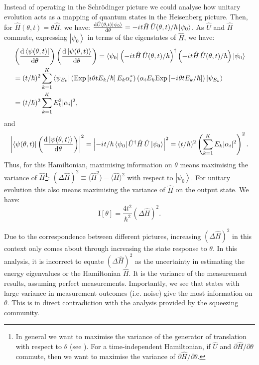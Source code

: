 \documentclass[reqno]{amsart}
\newcommand{\ket}[1]{\left| #1 \right>}
\newcommand{\bra}[1]{\left< #1 \right|}
\newcommand{\hham}{\hat{H}}
\newcommand{\U}{\hat{U}}
\newcommand{\iu}{{i\mkern1mu}}
\def\func#1#2{\mathrm{#1}\left[#2\right]}
\begin{document}
Instead of operating in the Schr\"odinger picture we could analyse how unitary evolution acts as a mapping of quantum states in the Heisenberg picture. Then, for $\hham(\theta, t) = \theta \hham$, we have: $\frac{\mathrm{d} \U(\theta,t)\ket{\psi_0}}{\mathrm{d}\theta} = -\iu t \hham \, \U(\theta, t)/\hbar \ket{\psi_0}$. As $\U$ and $\hham$ commute, expressing $\ket{\psi_0}$ in terms of the eigenstates of $\hham$, we have:
\[
\begin{split}
& \left(\frac{\mathrm{d}\bra{\psi(\theta,t)}}{\mathrm{d} \theta}\right)\left(\frac{\mathrm{d}\ket{\psi(\theta,t)}}{\mathrm{d} \theta}\right) = \bra{\psi_0}\left(-\iu t \hham \, \U(\theta,t)/\hbar\right)^{\dagger}\left(-\iu t \hham \, \U(\theta,t)/\hbar\right)\ket{\psi_0} \\
& = (t/\hbar)^2 \sum_{k = 1}^K \bra{\psi_{E_k}} \left(\func{Exp}{\iu \theta t E_k/\hbar}E_k \alpha_i^{\ast}\right)\left(\alpha_i E_k\func{Exp}{-\iu \theta t E_k/\hbar}\right) \ket{\psi_{E_k}}\\
& = (t/\hbar)^2 \sum_{k = 1}^K  E_k^2 |\alpha_i|^2,\\
\end{split}
\]
and
\[ \left|\bra{\psi(\theta,t)}\left(\frac{\mathrm{d}\ket{\psi(\theta,t)}}{\mathrm{d} \theta}\right)\right|^2 = \left|-\iu t/\hbar \bra{\psi_0}\U^{\dagger} \hham \,\U\ket{\psi_0}\right|^2 = (t/\hbar)^2\left(\sum_{k = 1}^K  E_k |\alpha_i|^2\right)^2.\]
Thus, for this Hamiltonian, maximising information on $\theta$ means maximising the variance of $\hham$\footnote{In general we want to maximise the variance of the generator of translation with respect to $\theta$ (see \cite{Braunstein1996, Pang2014, Pang2017}). For a time-independent Hamiltonian, if $\U$ and $\partial \hham/\partial \theta$ commute, then we want to maximise the variance of $\partial \hham/\partial \theta$.}: $(\Delta \hham)^2 \equiv \langle \hham^2 \rangle - \langle \hham \rangle^2$ with respect to $\ket{\psi_0}$. For unitary evolution this also means maximising the variance of $\hham$ on the output state. We have:
\[ \func{I}{\theta} = \frac{4t^2}{\hbar^2}\left(\Delta \hham\right)^2.\]

Due to the correspondence between different pictures, increasing $\left(\Delta \hham\right)^2$ in this context only comes about through increasing the state response to $\theta$. In this analysis, it is incorrect to equate $\left(\Delta \hham\right)^2$ as the uncertainty in estimating the energy eigenvalues or the Hamiltonian $\hham$. It is the variance of the measurement results, assuming perfect measurements. Importantly, we see that states with large variance in measurement outcomes (i.e. noise) give the most information on $\theta$. This is in direct contradiction with the analysis provided by the squeezing community.
\end{document}
